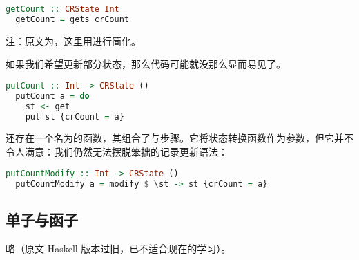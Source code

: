 \documentclass[./main.tex]{subfiles}
\begin{document}
\begin{lstlisting}[language=Haskell]
  getCount :: CRState Int
  getCount = gets crCount
\end{lstlisting}

注：原文为，这里用进行简化。

如果我们希望更新部分状态，那么代码可能就没那么显而易见了。

\begin{lstlisting}[language=Haskell]
  putCount :: Int -> CRState ()
  putCount a = do
    st <- get
    put st {crCount = a}
\end{lstlisting}

还存在一个名为的函数，其组合了与步骤。它将状态转换函数作为参数，但它并不令人满意：我们仍然无法摆脱笨拙的记录更新语法：

\begin{lstlisting}[language=Haskell]
  putCountModify :: Int -> CRState ()
  putCountModify a = modify $ \st -> st {crCount = a}
\end{lstlisting}

\subsection*{单子与函子}

略（原文 Haskell 版本过旧，已不适合现在的学习）。
\end{document}
